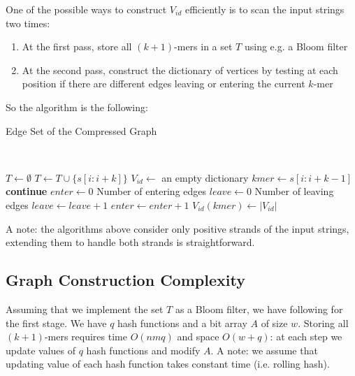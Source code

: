 \documentclass[a4paper, 12pt]{scrartcl}
\begin{document}
One of the possible ways to construct $V_{id}$ efficiently is to scan the input strings two times:
\begin{enumerate}
\item At the first pass, store all $(k + 1)$-mers in a set $T$ using e.g. a Bloom filter
\item At the second pass, construct the dictionary of vertices by testing at each position if there are different edges leaving or entering the current $k$-mer 
\end{enumerate}
So the algorithm is the following:
\begin{algorithm}[H]
\caption{Edge Set of the Compressed Graph} 
 \\ 
\begin{algorithmic}[1]
\State $T \gets \emptyset$
		\State $T \gets T \cup \{s[i:i + k]\}$
	\EndFor
\EndFor
\State $V_{id} \gets $ an empty dictionary
		\State $kmer \gets s[i: i + k - 1]$
			\State \textbf{continue}
		\EndIf
		\State $enter \gets 0$ \Comment Number of entering edges
		\State $leave \gets 0$ \Comment Number of leaving edges
				\State $leave \gets leave + 1$
			\EndIf
				\State $enter \gets enter + 1$
			\EndIf
		\EndFor
			\State $V_{id}(kmer) \gets |V_{id}|$
		\EndIf
	\EndFor
\EndFor
\end{algorithmic}
\end{algorithm}

A note: the algorithms above consider only positive strands of the input strings, extending them to handle both strands is straightforward.
\subsection{Graph Construction Complexity}
Assuming that we implement the set $T$ as a Bloom filter, we have following for the first stage.
We have $q$ hash functions and a bit array $A$ of size $w$.
Storing all $(k + 1)$-mers requires time $O(nmq)$ and space $O(w + q)$: at each step we update values of $q$ hash functions and modify $A$.
A note: we assume that updating value of each hash function takes constant time (i.e. rolling hash).
\end{document}
